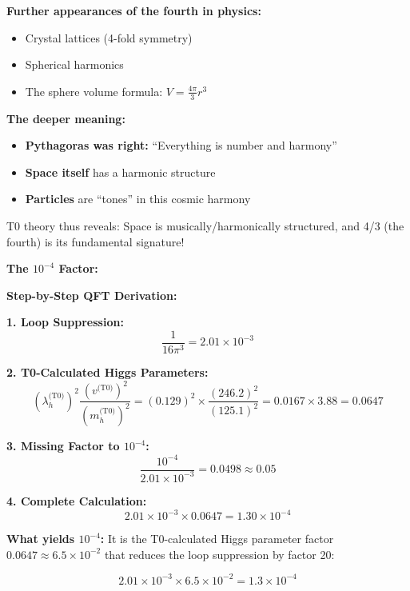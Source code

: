 \documentclass[12pt,a4paper]{article}
\begin{document}
\textbf{Further appearances of the fourth in physics:}
\begin{itemize}
	\item Crystal lattices (4-fold symmetry)
	\item Spherical harmonics
	\item The sphere volume formula: $V = \frac{4\pi}{3}r^3$
\end{itemize}

\textbf{The deeper meaning:}
\begin{itemize}
	\item \textbf{Pythagoras was right:} ``Everything is number and harmony''
	\item \textbf{Space itself} has a harmonic structure
	\item \textbf{Particles} are ``tones'' in this cosmic harmony
\end{itemize}

T0 theory thus reveals: Space is musically/harmonically structured, and 4/3 (the fourth) is its fundamental signature!

\textbf{The $10^{-4}$ Factor:}

\textbf{Step-by-Step QFT Derivation:}

\textbf{1. Loop Suppression:}
\begin{equation}
	\frac{1}{16\pi^3} = 2.01 \times 10^{-3}
\end{equation}

\textbf{2. T0-Calculated Higgs Parameters:}
\begin{equation}
	(\lambda_h^{\text{(T0)}})^2 \frac{(v^{\text{(T0)}})^2}{(m_h^{\text{(T0)}})^2} = (0.129)^2 \times \frac{(246.2)^2}{(125.1)^2} = 0.0167 \times 3.88 = 0.0647
\end{equation}

\textbf{3. Missing Factor to $10^{-4}$:}
\begin{equation}
	\frac{10^{-4}}{2.01 \times 10^{-3}} = 0.0498 \approx 0.05
\end{equation}

\textbf{4. Complete Calculation:}
\begin{equation}
	2.01 \times 10^{-3} \times 0.0647 = 1.30 \times 10^{-4}
\end{equation}

\textbf{What yields $10^{-4}$:}
It is the T0-calculated Higgs parameter factor $0.0647 \approx 6.5 \times 10^{-2}$ that reduces the loop suppression by factor 20:

\begin{equation}
	2.01 \times 10^{-3} \times 6.5 \times 10^{-2} = 1.3 \times 10^{-4}
\end{equation}
\end{document}
